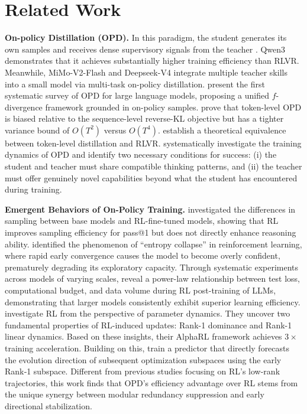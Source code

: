 \documentclass{llmxive}
\begin{document}
\section{Related Work}
\label{Related Work}

\textbf{On-policy Distillation (OPD).}
In this paradigm, the student generates its own samples and receives dense supervisory signals from the teacher \citep{agarwal2024policy}. Qwen3 \citep{yang2025qwen3technicalreport} demonstrates that it achieves substantially higher training efficiency than RLVR. Meanwhile, MiMo-V2-Flash \citep{xiao2026mimo} and Deepseek-V4 \citep{deepseek2026v4} integrate multiple teacher skills into a small model via multi-task on-policy distillation. \cite{song2026survey} present the first systematic survey of OPD for large language models, proposing a unified $f$-divergence framework grounded in on-policy samples. \cite{fu2026revisiting} prove that token-level OPD is biased relative to the sequence-level reverse-KL objective but has a tighter variance bound of $O(T^2)$ versus $O(T^4)$. \cite{yang2026learning} establish a theoretical equivalence between token-level distillation and RLVR. \cite{li2026rethinking} systematically investigate the training dynamics of OPD and identify two necessary conditions for success: (i) the student and teacher must share compatible thinking patterns, and (ii) the teacher must offer genuinely novel capabilities beyond what the student has encountered during training.

\textbf{Emergent Behaviors of On-Policy Training.}
\cite{yue2025doesreinforcementlearningreally} investigated the differences in sampling between base models and RL-fine-tuned models, showing that RL improves sampling efficiency for pass@1 but does not directly enhance reasoning ability.  
\cite{cui2025entropymechanismreinforcementlearning} identified the phenomenon of ``entropy collapse'' in reinforcement learning, where rapid early convergence causes the model to become overly confident, prematurely degrading its exploratory capacity. Through systematic experiments across models of varying scales, \cite{tan2026scalingbehaviorsllmreinforcement} reveal a power-law relationship between test loss, computational budget, and data volume during RL post-training of LLMs, demonstrating that larger models consistently exhibit superior learning efficiency. \cite{cai2025predictability} investigate RL from the perspective of parameter dynamics. They uncover two fundamental properties of RL-induced updates: Rank-1 dominance and Rank-1 linear dynamics. Based on these insights, their AlphaRL framework achieves $3 \times$ training acceleration. Building on this, \cite{chen2026lowrankoptimizationtrajectoriesmodeling} train a predictor that directly forecasts the evolution direction of subsequent optimization subspaces using the early Rank‑1 subspace. Different from previous studies focusing on RL's low-rank trajectories, this work finds that OPD's efficiency advantage over RL stems from the unique synergy between modular redundancy suppression and early directional stabilization.
\end{document}
